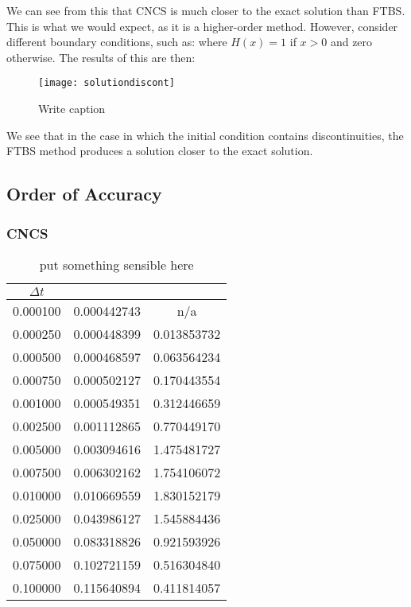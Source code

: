 \documentclass[10pt]{article}
\begin{document}
We can see from this that CNCS is much closer to the exact solution than FTBS. This is what we would expect, as it is a higher-order method. However, consider different boundary conditions, such as:
where $H(x) = 1$ if $x>0$ and zero otherwise. The results of this are then:

\begin{figure}[H]
\centering
\texttt{[image: solutiondiscont]}
\caption{Write caption}
\end{figure}

We see that in the case in which the initial condition contains discontinuities, the FTBS method produces a solution closer to the exact solution. 

\subsection{Order of Accuracy}
\subsubsection{CNCS}
\begin{table}[H]
	\centering
		\begin{tabular}{|c|c|c|}
			\hline
							$\Delta t$        & \text{Error}		&	\text{Gradient}\\
			\hline
                                0.000100        & 0.000442743 & n/a \\ 
			\hline
                                0.000250        & 0.000448399 & 0.013853732 \\ 
			\hline
                                0.000500        & 0.000468597 & 0.063564234 \\ 
			\hline
                                0.000750        & 0.000502127 & 0.170443554 \\ 
			\hline
                                0.001000        & 0.000549351 & 0.312446659 \\ 
			\hline
                                0.002500        & 0.001112865 & 0.770449170 \\ 
			\hline
                                0.005000        & 0.003094616 & 1.475481727 \\ 
			\hline
                                0.007500        & 0.006302162 & 1.754106072 \\ 
			\hline
                                0.010000        & 0.010669559 & 1.830152179 \\ 
			\hline
                                0.025000        & 0.043986127 & 1.545884436 \\ 
			\hline
                                0.050000        & 0.083318826 & 0.921593926 \\ 
			\hline
                                0.075000        & 0.102721159 & 0.516304840 \\ 
			\hline
                                0.100000        & 0.115640894 & 0.411814057 \\ 
              \hline
		\end{tabular}
		\caption{put something sensible here}
\end{table}
\end{document}
